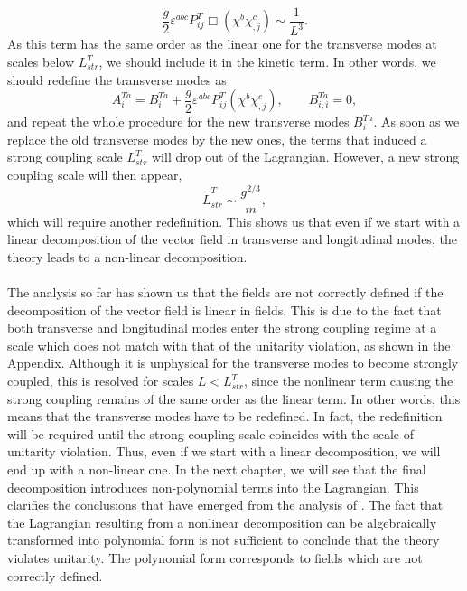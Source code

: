 \documentclass{article}
\begin{document}
\begin{equation}
   \frac{g}{2}\varepsilon^{abc}P_{ij}^T\Box\left(\chi^b\chi^c_{,j}\right)\sim\frac{1}{L^3}.
\end{equation}
As this term has the same order as the linear one for the transverse modes at scales below $L^T_{str}$, we should include it in the kinetic term. In other words, we should redefine the transverse modes as  
\begin{equation}\label{eq::redef}
    A_i^{Ta}=B_i^{Ta}+\frac{g}{2}\varepsilon^{abc}P_{ij}^T\left(\chi^b\chi_{,j}^c\right),\qquad B_{i,i}^{Ta}=0,
\end{equation}
and repeat the whole procedure for the new transverse modes $B_i^{Ta}$. As soon as we replace the old transverse modes by the new ones, the terms that induced a strong coupling scale $L^T_{str}$ will drop out of the Lagrangian. However, a new strong coupling scale will then appear,
\begin{equation}
    \tilde{L}^T_{str}\sim\frac{g^{2/3}}{m},
\end{equation} 
which will require another redefinition. This shows us that even if we start with a linear decomposition of the vector field in  transverse and longitudinal modes, the theory leads to a non-linear decomposition.
\\\\
The analysis so far has shown us that the fields are not correctly defined if the decomposition of the vector field is linear in fields. This is due to the fact that both transverse and longitudinal modes enter the strong coupling regime at a scale which does not match with that of the unitarity violation, as shown in the Appendix. Although it is unphysical for the transverse modes to become strongly coupled, this is resolved for scales $L<L_{str}^T$, since the nonlinear term causing the strong coupling remains of the same order as the linear term. In other words, this means that the transverse modes have to be redefined. In fact, the redefinition will be required until the strong coupling scale coincides with the scale of unitarity violation. Thus, even if we start with a linear decomposition, we will end up with a non-linear one. In the next chapter, we will see that the final decomposition introduces non-polynomial terms into the Lagrangian. 
This clarifies the conclusions that have emerged from the analysis of \cite{Dragon}. The fact that the Lagrangian resulting from a nonlinear decomposition can be algebraically transformed into polynomial form is not sufficient to conclude that the theory violates unitarity. The polynomial form corresponds to fields which are not correctly defined.
\end{document}
